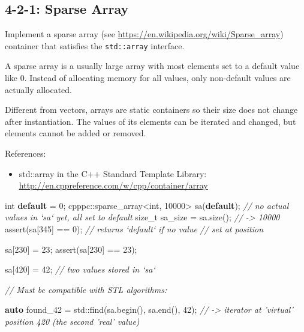 \documentclass[]{article}
\newenvironment{Shaded}{}{}
\newcommand{\KeywordTok}[1]{\textcolor[rgb]{0.00,0.44,0.13}{\textbf{{#1}}}}
\newcommand{\DataTypeTok}[1]{\textcolor[rgb]{0.56,0.13,0.00}{{#1}}}
\newcommand{\DecValTok}[1]{\textcolor[rgb]{0.25,0.63,0.44}{{#1}}}
\newcommand{\CommentTok}[1]{\textcolor[rgb]{0.38,0.63,0.69}{\textit{{#1}}}}
\newcommand{\NormalTok}[1]{{#1}}
\providecommand{\tightlist}{%
  \setlength{\itemsep}{0pt}\setlength{\parskip}{0pt}}
\begin{document}
\subsection{4-2-1: Sparse Array}\label{sparse-array}

Implement a sparse array (see
\url{https://en.wikipedia.org/wiki/Sparse_array}) container that
satisfies the \texttt{std::array} interface.

A sparse array is a usually large array with most elements set to a
default value like 0. Instead of allocating memory for all values, only
non-default values are actually allocated.

Different from vectors, arrays are static containers so their size does
not change after instantiation. The values of its elements can be
iterated and changed, but elements cannot be added or removed.

References:

\begin{itemize}
\tightlist
\item
  std::array in the C++ Standard Template Library:
  \url{http://en.cppreference.com/w/cpp/container/array}
\end{itemize}

\begin{Shaded}
\begin{Highlighting}[]
\DataTypeTok{int} \KeywordTok{default} \NormalTok{= }\DecValTok{0}\NormalTok{;}
\NormalTok{cpppc::sparse_array<}\DataTypeTok{int}\NormalTok{, }\DecValTok{10000}\NormalTok{> sa(}\KeywordTok{default}\NormalTok{);}
\CommentTok{// no actual values in `sa` yet, all set to default}
\NormalTok{size_t sa_size = sa.size(); }\CommentTok{// -> 10000}
\NormalTok{assert(sa[}\DecValTok{345}\NormalTok{] == }\DecValTok{0}\NormalTok{);       }\CommentTok{// returns `default` if no value}
                            \CommentTok{// set at position}

\NormalTok{sa[}\DecValTok{230}\NormalTok{] = }\DecValTok{23}\NormalTok{;}
\NormalTok{assert(sa[}\DecValTok{230}\NormalTok{] == }\DecValTok{23}\NormalTok{);}

\NormalTok{sa[}\DecValTok{420}\NormalTok{] = }\DecValTok{42}\NormalTok{;}
\CommentTok{// two values stored in `sa`}

\CommentTok{// Must be compatible with STL algorithms:}

\KeywordTok{auto} \NormalTok{found_42 = std::find(sa.begin(), sa.end(), }\DecValTok{42}\NormalTok{);}
\CommentTok{// -> iterator at 'virtual' position 420 (the second 'real' value)}
\end{Highlighting}
\end{Shaded}
\end{document}
